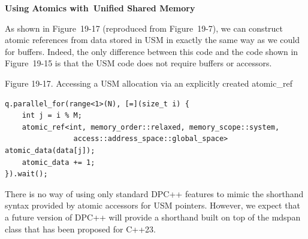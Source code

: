 \hspace*{\fill} \par %
\textbf{Using Atomics with Unified Shared Memory}

As shown in Figure 19-17 (reproduced from Figure 19-7), we can construct atomic references from data stored in USM in exactly the same way as we could for buffers. Indeed, the only difference between this code and the code shown in Figure 19-15 is that the USM code does not require buffers or accessors.\par

\hspace*{\fill} \par %
Figure 19-17. Accessing a USM allocation via an explicitly created atomic\_ref
\begin{lstlisting}[caption={}]
q.parallel_for(range<1>(N), [=](size_t i) {
	int j = i % M;
	atomic_ref<int, memory_order::relaxed, memory_scope::system,
				access::address_space::global_space> atomic_data(data[j]);
	atomic_data += 1;
}).wait();
\end{lstlisting}

There is no way of using only standard DPC++ features to mimic the shorthand syntax provided by atomic accessors for USM pointers. However, we expect that a future version of DPC++ will provide a shorthand built on top of the mdspan class that has been proposed for C++23.\par























